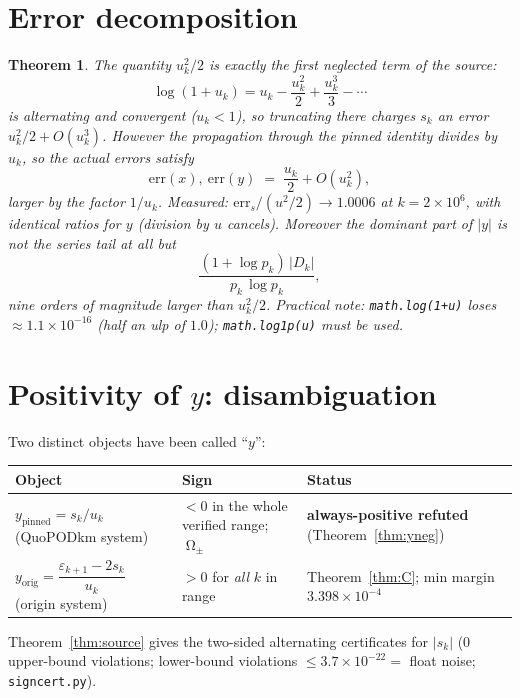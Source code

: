 \documentclass[11pt]{article}
\newtheorem{theorem}{Theorem}[section]
\theoremstyle{remark}
\newcommand{\uk}{u_k}
\newcommand{\eps}{\varepsilon}
\DeclareMathOperator{\Om}{\Omega}
\begin{document}
\section{Error decomposition}\label{sec:error}

\begin{theorem}\label{thm:err}
The quantity $u_k^2/2$ is exactly the first neglected term of the \emph{source}:
\[
\log(1+\uk)=\uk-\frac{\uk^2}2+\frac{\uk^3}3-\cdots
\]
is alternating and convergent ($\uk<1$), so truncating there charges $s_k$ an
error $u_k^2/2+O(u_k^3)$. However the propagation through the pinned identity
divides by $\uk$, so the actual errors satisfy
\[
\mathrm{err}(x),\ \mathrm{err}(y)\;=\;\frac{\uk}2+O(\uk^2),
\]
larger by the factor $1/\uk$. Measured: $\mathrm{err}_s/(u^2/2)\to1.0006$ at
$k=2\times10^6$, with identical ratios for $y$ (division by $u$ cancels).
Moreover the \emph{dominant} part of $|y|$ is not the series tail at all but
\[
\frac{(1+\log p_k)\,|D_k|}{p_k\,\log p_k},
\]
nine orders of magnitude larger than $u_k^2/2$. Practical note:
\texttt{math.log(1+u)} loses $\approx1.1\times10^{-16}$ (half an ulp of $1.0$);
\texttt{math.log1p(u)} must be used.
\end{theorem}

\section{Positivity of $y$: disambiguation}\label{sec:y}

Two distinct objects have been called ``$y$'':

\begin{center}
\begin{tabular}{@{}lll@{}}
\toprule
Object & Sign & Status \\
\midrule
$y_{\mathrm{pinned}}=s_k/\uk$ (QuoPODkm system) & $<0$ in the whole verified range; $\Om_\pm$ &
\textbf{always-positive refuted} (Theorem~\ref{thm:yneg})\\[2pt]
$y_{\mathrm{orig}}=\dfrac{\eps_{k+1}-2s_k}{\uk}$ (origin system) & $>0$ for \emph{all} $k$ in range &
Theorem~\ref{thm:C}; min margin $3.398\times10^{-4}$\\
\bottomrule
\end{tabular}
\end{center}

Theorem~\ref{thm:source} gives the two-sided alternating certificates for
$|s_k|$ (0 upper-bound violations; lower-bound violations
$\le3.7\times10^{-22}=$ float noise; \texttt{signcert.py}).
\end{document}
